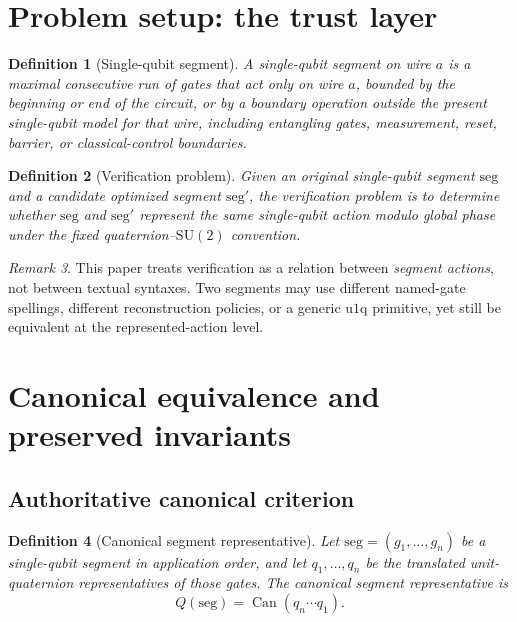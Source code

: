 \documentclass[11pt]{article}
\newtheorem{definition}{Definition}[section]
\theoremstyle{remark}
\newtheorem{remark}[definition]{Remark}
\newcommand{\SU}{\mathrm{SU}}
\newcommand{\uoneq}{\mathrm{u1q}}
\newcommand{\canon}{\operatorname{Can}}
\begin{document}
\section{Problem setup: the trust layer}

\begin{definition}[Single-qubit segment]
A \emph{single-qubit segment} on wire $a$ is a maximal consecutive run of gates
that act only on wire $a$, bounded by the beginning or end of the circuit, or
by a boundary operation outside the present single-qubit model for that wire,
including entangling gates, measurement, reset, barrier, or classical-control
boundaries.
\end{definition}

\begin{definition}[Verification problem]
Given an original single-qubit segment $\mathrm{seg}$ and a candidate optimized
segment $\mathrm{seg}'$, the verification problem is to determine whether
$\mathrm{seg}$ and $\mathrm{seg}'$ represent the same single-qubit action modulo
global phase under the fixed quaternion--$\SU(2)$ convention.
\end{definition}

\begin{remark}
This paper treats verification as a relation between \emph{segment actions}, not
between textual syntaxes. Two segments may use different named-gate spellings,
different reconstruction policies, or a generic $\uoneq$ primitive, yet still be
equivalent at the represented-action level.
\end{remark}

\section{Canonical equivalence and preserved invariants}

\subsection{Authoritative canonical criterion}

\begin{definition}[Canonical segment representative]
Let $\mathrm{seg}=(g_1,\dots,g_n)$ be a single-qubit segment in application
order, and let $q_1,\dots,q_n$ be the translated unit-quaternion representatives
of those gates. The canonical segment representative is
\[
Q(\mathrm{seg})=\canon(q_n\cdots q_1).
\]
\end{definition}
\end{document}

